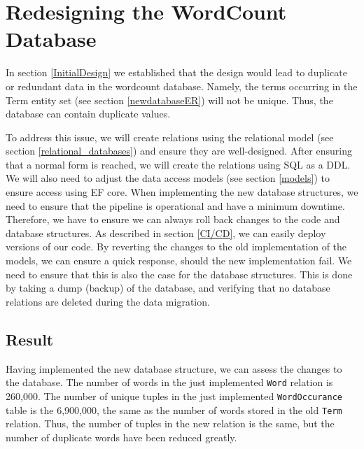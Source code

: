 \section{Redesigning the WordCount Database}
In section \ref{InitialDesign} we established that the design would lead to duplicate or redundant data in the wordcount database.
Namely, the terms occurring in the Term entity set (see section \ref{newdatabaseER}) will not be unique. 
Thus, the database can contain duplicate values.
 
To address this issue, we will create relations using the relational model (see section \ref{relational_databases}) and ensure they are well-designed.
After ensuring that a normal form is reached, we will create the relations using SQL as a DDL.
We will also need to adjust the data access models (see section \ref{models}) to ensure access using EF core.
When implementing the new database structures, we need to ensure that the pipeline is operational and have a minimum downtime. 
Therefore, we have to ensure we can always roll back changes to the code and database structures.
As described in section \ref{CI/CD}, we can easily deploy versions of our code.
By reverting the changes to the old implementation of the models, we can ensure a quick response, should the new implementation fail.
We need to ensure that this is also the case for the database structures.
This is done by taking a dump (backup) of the database, and verifying that no database relations are deleted during the data migration.




\subsection{Result}
Having implemented the new database structure, we can assess the changes to the database. 
The number of words in the just implemented \texttt{Word} relation is 260,000.
The number of unique tuples in the just implemented \texttt{WordOccurance} table is the 6,900,000, the same as the number of words stored in the old \texttt{Term} relation.
Thus, the number of tuples in the new relation is the same, but the number of duplicate words have been reduced greatly.

